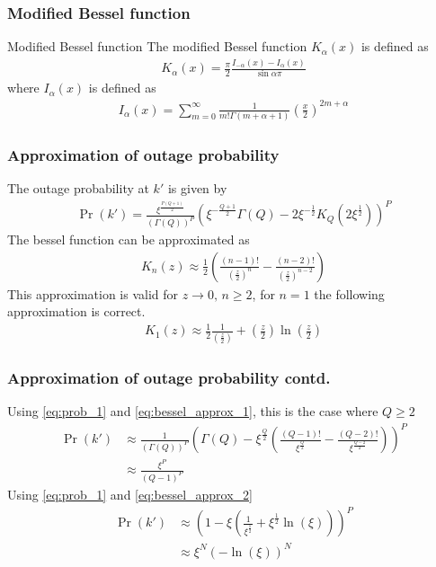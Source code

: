 \documentclass{beamer}
\providecommand{\pr}[1]{\ensuremath{\Pr\left(#1\right)}}
\providecommand{\brak}[1]{\ensuremath{\left(#1\right)}}
\begin{document}
\begin{frame}
\frametitle{Modified Bessel function}
\begin{block}{Modified Bessel function}
The modified Bessel function $K_\alpha(x)$ is defined as 
\begin{align}
K_\alpha(x)=\frac{\pi}{2}\frac{I_{-\alpha}(x)-I_\alpha(x)}{\sin{\alpha\pi}}
\end{align}
where $I_\alpha(x)$ is defined as
\begin{align}
I_\alpha(x)=\displaystyle\sum_{m=0}^{\infty}\frac{1}{m!\Gamma(m+\alpha+1)}\brak{\frac{x}{2}}^{2m+\alpha}
\end{align} 
\end{block}
\end{frame}

\begin{frame}
\frametitle{Approximation of outage probability}
The outage probability at $k'$ is given by
\begin{align}
\pr{k'}=\frac{\xi^{\frac{P(Q+1)}{2}}}{(\Gamma(Q))^P}\brak{\xi^{-\frac{Q+1}{2}}\Gamma(Q)-2\xi^{-\frac{1}{2}}K_{Q}\brak{2\xi^\frac{1}{2}}}^P\label{eq:prob_1}
\end{align}
The bessel function can be approximated as
\begin{align}
K_n(z)\approx\frac{1}{2}\brak{\frac{(n-1)!}{\brak{\frac{z}{2}}^n}-\frac{(n-2)!}{\brak{\frac{z}{2}}^{n-2}}}\label{eq:bessel_approx_1}
\end{align}
This approximation is valid for $z\to 0,\, n\geq 2$, for $n=1$ the following approximation is correct.
\begin{align}
K_1(z)\approx \frac{1}{2} \frac{1}{\brak{\frac{z}{2}}}+\brak{\frac{z}{2}}\ln\brak{\frac{z}{2}}\label{eq:bessel_approx_2}
\end{align}
\end{frame}

\begin{frame}
\frametitle{Approximation of outage probability contd.}
Using \eqref{eq:prob_1} and \eqref{eq:bessel_approx_1}, this is the case where $Q\geq 2$
\begin{align}
\pr{k'}&\approx \frac{1}{(\Gamma(Q))^P}\brak{\Gamma(Q)-\xi^\frac{Q}{2}\brak{\frac{(Q-1)!}{\xi^\frac{Q}{2}}-\frac{(Q-2)!}{\xi^\frac{Q-2}{2}}}}^P\\
&\approx \frac{\xi^P}{(Q-1)^P}
\end{align}
Using \eqref{eq:prob_1} and \eqref{eq:bessel_approx_2}
\begin{align}
\pr{k'}&\approx \brak{1-\xi\brak{\frac{1}{\xi^\frac{1}{2}}+\xi^\frac{1}{2}\ln\brak{\xi}}}^P\\
&\approx \xi^N\brak{-\ln\brak{\xi}}^N
\end{align}

\end{frame}
\end{document}
